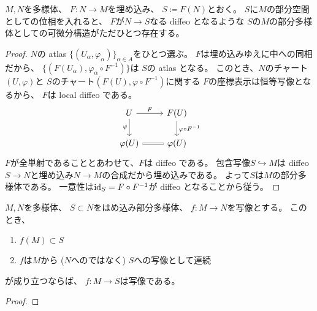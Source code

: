 \documentclass[report]{jlreq}
\begin{document}
\begin{proposition}[埋め込みの像は部分多様体]
    $M, N$を多様体、
    $F \colon N \to M$を埋め込み、
    $S \coloneqq F(N)$とおく。
    $S$に$M$の部分空間としての位相を入れると、
    $F$が$N \to S$なる diffeo となるような
    $S$の$M$の部分多様体としての可微分構造がただひとつ存在する。
\end{proposition}

\begin{proof}
    $N$の atlas $\{ (U_\alpha, \varphi_\alpha) \}_{\alpha \in A}$をひとつ選ぶ。
    $F$は埋め込みゆえに中への同相だから、
    $\{ (F(U_\alpha), \varphi_\alpha \circ F^{-1}) \}$は
    $S$の atlas となる。
    このとき、$N$のチャート$(U, \varphi)$と
    $S$のチャート$(F(U), \varphi \circ F^{-1})$に関する
    $F$の座標表示は恒等写像となるから、
    $F$は local diffeo である。
    \begin{equation}
        \begin{tikzcd}
            U
                \ar{r}{F}
                \ar{d}[swap]{\varphi}
                & F(U)
                    \ar{d}{\varphi \circ F^{-1}} \\
            \varphi(U)
                \ar[equal]{r}
                & \varphi(U)
        \end{tikzcd}
    \end{equation}
    $F$が全単射であることとあわせて、$F$は diffeo である。
    包含写像$S \hookrightarrow M$は
    diffeo $S \to N$と埋め込み$N \to M$の合成だから埋め込みである。
    よって$S$は$M$の部分多様体である。
    一意性は$\mathrm{id}_S = F \circ F^{-1}$が diffeo となることから従う。
\end{proof}

\begin{definition}
    \TODO{}
\end{definition}

\begin{theorem}[はめ込み多様体への値域の制限]
    $M, N$を多様体、
    $S \subset N$をはめ込み部分多様体、
    $f \colon M \to N$を{\smooth}写像とする。
    このとき、
    \begin{enumerate}
        \item $f(M) \subset S$
        \item $f$は$M$から ($N$へのではなく) $S$への写像として連続
    \end{enumerate}
    が成り立つならば、
    $f \colon M \to S$は{\smooth}写像である。
\end{theorem}

\begin{proof}
    \TODO{}
\end{proof}
\end{document}
